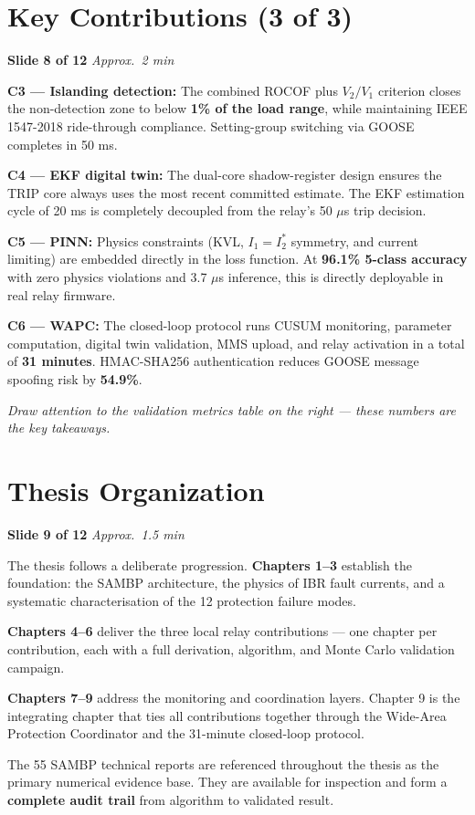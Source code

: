 \documentclass[12pt, a4paper]{article}
\newenvironment{notebox}{%
  \begin{tcolorbox}[
    colback=noteBg,
    colframe=iitmMaroon!40,
    boxrule=0.6pt,
    arc=3pt,
    left=8pt, right=8pt, top=6pt, bottom=6pt
  ]
  \setstretch{1.4}\small
}{%
  \end{tcolorbox}
}
\newcommand{\slidetag}[2]{%
  \noindent
  \textcolor{slideNum}{\footnotesize\bfseries Slide #1} \hfill
  \textcolor{iitmGold!80!black}{\footnotesize\itshape Approx.\ #2}\\[2pt]
}
\begin{document}
\section{Key Contributions (3 of 3)}

\slidetag{8 of 12}{2 min}
\begin{notebox}
\textbf{C3 --- Islanding detection:}
The combined ROCOF plus $V_2/V_1$ criterion closes the non-detection zone to below
\textbf{1\% of the load range}, while maintaining IEEE 1547-2018 ride-through
compliance. Setting-group switching via GOOSE completes in 50 ms.

\textbf{C4 --- EKF digital twin:}
The dual-core shadow-register design ensures the TRIP core always uses the most recent
committed estimate. The EKF estimation cycle of 20 ms is completely decoupled from the
relay's 50 $\mu$s trip decision.

\textbf{C5 --- PINN:}
Physics constraints (KVL, $I_1 = I_2^*$ symmetry, and current limiting) are embedded
directly in the loss function. At \textbf{96.1\% 5-class accuracy} with zero physics
violations and 3.7 $\mu$s inference, this is directly deployable in real relay firmware.

\textbf{C6 --- WAPC:}
The closed-loop protocol runs CUSUM monitoring, parameter computation, digital twin
validation, MMS upload, and relay activation in a total of \textbf{31 minutes}.
HMAC-SHA256 authentication reduces GOOSE message spoofing risk by \textbf{54.9\%}.

\textit{Draw attention to the validation metrics table on the right --- these numbers
are the key takeaways.}
\end{notebox}

\section{Thesis Organization}

\slidetag{9 of 12}{1.5 min}
\begin{notebox}
The thesis follows a deliberate progression.
\textbf{Chapters 1--3} establish the foundation: the SAMBP architecture, the physics
of IBR fault currents, and a systematic characterisation of the 12 protection failure
modes.

\textbf{Chapters 4--6} deliver the three local relay contributions --- one chapter per
contribution, each with a full derivation, algorithm, and Monte Carlo validation campaign.

\textbf{Chapters 7--9} address the monitoring and coordination layers. Chapter 9 is the
integrating chapter that ties all contributions together through the Wide-Area Protection
Coordinator and the 31-minute closed-loop protocol.

The 55 SAMBP technical reports are referenced throughout the thesis as the primary
numerical evidence base. They are available for inspection and form a \textbf{complete
audit trail} from algorithm to validated result.
\end{notebox}
\end{document}
